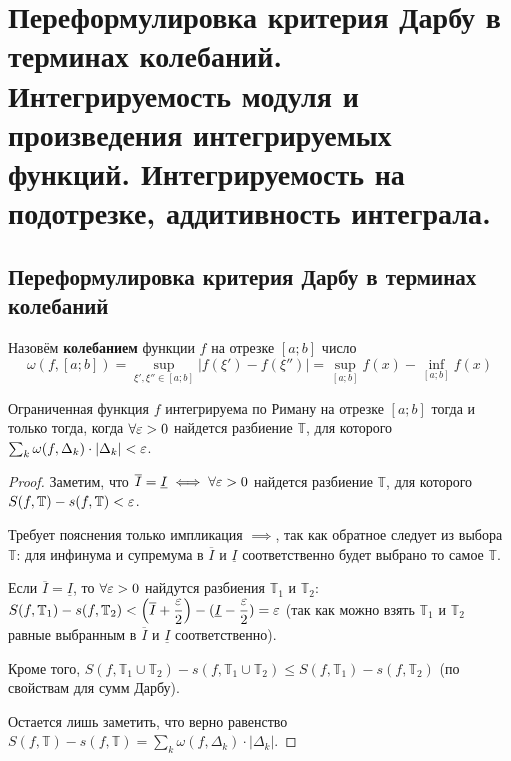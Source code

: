 \documentclass[a4paper]{article}
\theoremstyle{named}
\newcommand{\T}{\mathbb{T}}
\begin{document}
    \section{Переформулировка критерия Дарбу в терминах колебаний. Интегрируемость модуля и произведения интегрируемых функций. Интегрируемость на подотрезке, аддитивность интеграла.}

        \subsection{Переформулировка критерия Дарбу в терминах колебаний}

        \begin{definition*}
            Назовём \textbf{колебанием} функции $f$ на отрезке $[a; b]$ число
            \begin{equation*}
                \omega(f, [a; b]) = \sup\limits_{\xi', \xi'' \in [a; b]} |f(\xi') - f(\xi'')| = \sup\limits_{[a; b]} f(x) - \inf\limits_{[a; b]} f(x)
            \end{equation*}
        \end{definition*}

        \begin{consequence*}
            Ограниченная функция $f$ интегрируема по Риману на отрезке $[a; b]$ тогда и только тогда, когда $\forall \varepsilon > 0$ найдется разбиение $\T$, для которого $\sum_k \omega(f, \Delta_k) \cdot |\Delta_k| < \varepsilon$.
        \end{consequence*}

        \begin{proof}
            Заметим, что $\overline{I} = \underline{I} \iff \forall \varepsilon > 0$ найдется разбиение $\T$, для которого $S(f, \T) - s(f, \T) < \eps$.

            Требует пояснения только импликация $\implies$, так как обратное следует из выбора $\T$: для инфинума и супремума в $\overline{I}$ и $\underline{I}$ соответственно будет выбрано то самое $\T$.

            Если $\overline{I} = \underline{I}$, то $\forall \varepsilon > 0$ найдутся разбиения $\T_1$ и $\T_2$: $S(f, \T_1) - s(f, \T_2) < \left(\overline{I} + \dfrac{\eps}{2}\right) - (\underline{I} - \dfrac{\eps}{2}) = \eps$ (так как можно взять $\T_1$ и $\T_2$ равные выбранным в $\overline{I}$ и $\underline{I}$ соответственно).

            Кроме того, $S(f, \T_1 \cup \T_2) - s(f, \T_1 \cup \T_2) \leq S(f, \T_1) - s(f, \T_2)$ (по свойствам для сумм Дарбу). 

            Остается лишь заметить, что верно равенство $S(f, \T) - s(f, \T) = \sum_k \omega(f, \Delta_k) \cdot |\Delta_k|$.
        \end{proof}
\end{document}
